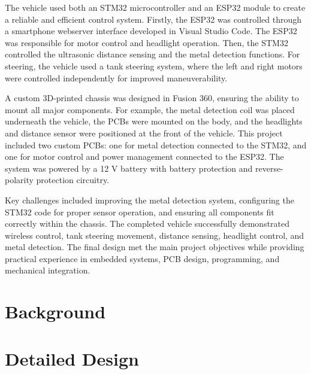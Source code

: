 \documentclass[11pt]{article}
\begin{document}
The vehicle used both an STM32 microcontroller and an ESP32 module to create a reliable and efficient control system. Firstly, the ESP32 was controlled through a smartphone webserver interface developed in Visual Studio Code. The ESP32 was responsible for motor control and headlight operation. Then, the STM32 controlled the ultrasonic distance sensing and the metal detection functions. For steering, the vehicle used a tank steering system, where the left and right motors were controlled independently for improved maneuverability.

A custom 3D-printed chassis was designed in Fusion 360, ensuring the ability to mount all major components. For example, the metal detection coil was placed underneath the vehicle, the PCBs were mounted on the body, and the headlights and distance sensor were positioned at the front of the vehicle. This project included two custom PCBs: one for metal detection connected to the STM32, and one for motor control and power management connected to the ESP32. The system was powered by a 12 V battery with battery protection and reverse-polarity protection circuitry.

Key challenges included improving the metal detection system, configuring the STM32 code for proper sensor operation, and ensuring all components fit correctly within the chassis. The completed vehicle successfully demonstrated wireless control, tank steering movement, distance sensing, headlight control, and metal detection. The final design met the main project objectives while providing practical experience in embedded systems, PCB design, programming, and mechanical integration.

\newpage

\section{Background}

\newpage

\section{Detailed Design}
\end{document}
